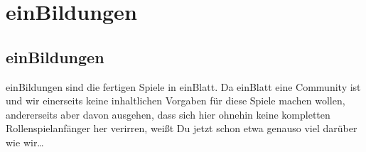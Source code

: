 
\part {einBildungen}
\chapter {einBildungen}
einBildungen sind die fertigen Spiele in einBlatt. Da einBlatt eine Community ist und wir einerseits keine inhaltlichen Vorgaben für diese Spiele machen wollen, andererseits aber davon ausgehen, dass sich hier ohnehin keine kompletten Rollenspielanfänger her verirren, weißt Du jetzt schon etwa genauso viel darüber wie wir\dots
